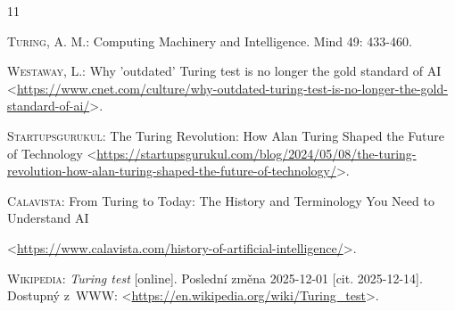 \documentclass[a4paper,oneside,11pt,usenames,dvipsnames]{article}
\begin{document}
\begin{thebibliography}{11}
\setlength{\parskip}{0ex}

	 \textsc{Turing, A. M.}: Computing Machinery and Intelligence. Mind 49: 433-460.

	 \textsc{Westaway, L.}: Why 'outdated' Turing test is no longer the gold standard of AI \textless{}\url{https://www.cnet.com/culture/why-outdated-turing-test-is-no-longer-the-gold-standard-of-ai/}\textgreater{}.

	 \textsc{Startupsgurukul}: The Turing Revolution: How Alan Turing Shaped the Future of Technology
 \textless{}\url{https://startupsgurukul.com/blog/2024/05/08/the-turing-revolution-how-alan-turing-shaped-the-future-of-technology/}\textgreater{}.

	 \textsc{Calavista}: From Turing to Today: The History and Terminology You Need to Understand AI

 \textless{}\url{https://www.calavista.com/history-of-artificial-intelligence/}\textgreater{}.

	 \textsc{Wikipedia:} \textit{Turing test} [online]. Poslední změna 2025-12-01 [cit. 2025-12-14]. Dostupný z~WWW: \textless\url{https://en.wikipedia.org/wiki/Turing_test}\textgreater.

\end{thebibliography}
\end{document}
